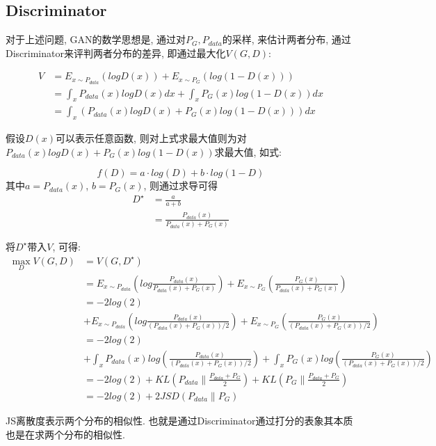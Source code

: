 \subsection{Discriminator}
对于上述问题, GAN的数学思想是, 通过对$P_{G}, P_{data}$的采样, 来估计两者分布, 通过Discriminator来评判两者分布的差异, 即通过最大化$V(G,D)$:

\begin{align*}
    V &= E_{x\sim P_{data}}(logD(x)) + E_{x\sim P_{G}}( log(1-D(x))) \\
    & = \int_{x} P_{data}(x) logD(x) dx + \int_{x} P_{G}(x) log(1-D(x)) dx \\
    & = \int_{x}(P_{data}(x) logD(x) + P_{G}(x) log(1-D(x))) dx
\end{align*}

假设$D(x)$可以表示任意函数, 则对上式求最大值则为对$P_{data}(x) logD(x) + P_{G}(x) log(1-D(x))$求最大值, 如式:

\begin{equation*}
    f(D) = a \cdot log(D) + b \cdot log(1-D) 
\end{equation*}
其中$a = P_{data}(x)$, $b = P_{G}(x)$, 则通过求导可得
\begin{align*}
    D^{\star} &= \frac{a}{a+b} \\
    & = \frac{P_{data}(x)}{P_{data}(x) + P_{G}(x)}
\end{align*}

将$D^{\star}$带入$V$, 可得:
\begin{align*}
    \max \limits_{D} V(G,D) &= V(G, D^{\star}) \\
    & =  E_{x\sim P_{data}}(log\frac{P_{data}(x)}{P_{data}(x) + P_{G}(x)}) + E_{x\sim P_{G}}(\frac{P_{G}(x)}{P_{data}(x) + P_{G}(x)}) \\
    & = -2log(2) \\
    & + E_{x\sim P_{data}}(log\frac{P_{data}(x)}{(P_{data}(x) + P_{G}(x))/2}) + E_{x\sim P_{G}}(\frac{P_{G}(x)}{(P_{data}(x) + P_{G}(x))/2}) \\
    & = -2log(2) \\
    & + \int_{x} P_{data}(x) log(\frac{P_{data}(x)}{(P_{data}(x) + P_{G}(x))/2}) + \int_{x} P_{G}(x) log(\frac{P_{G}(x)}{(P_{data}(x) + P_{G}(x))/2}) \\
    & = -2log(2) + KL(P_{data}\parallel \frac{P_{data}+P_{G}}{2} ) + KL(P_{G}\parallel \frac{P_{data}+P_{G}}{2})\\
    & = -2log(2) + 2JSD(P_{data}\parallel P_{G})
\end{align*}

JS离散度表示两个分布的相似性. 也就是通过Discriminator通过打分的表象其本质也是在求两个分布的相似性. 



